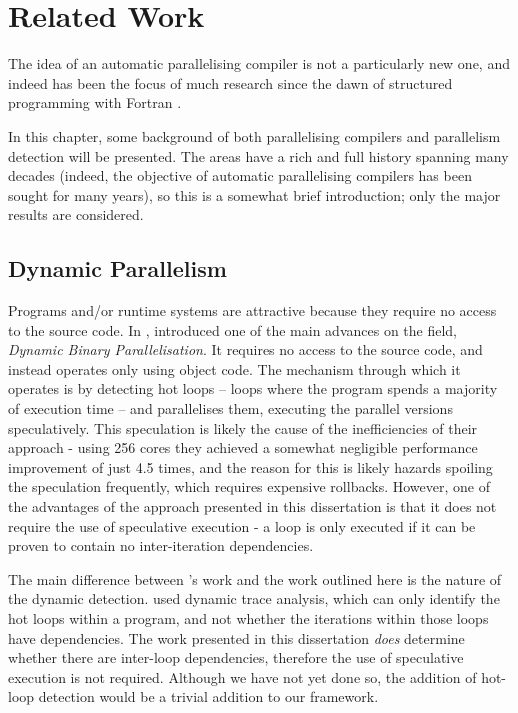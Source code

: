 \chapter{Related Work} \label{chp:related}
The idea of an automatic parallelising compiler is not a particularly new one, and indeed has been the focus of much research since the dawn of structured programming with Fortran \citep{Backus1979}.

In this chapter, some background of both parallelising compilers and parallelism detection will be presented. The areas have a rich and full history spanning many decades (indeed, the objective of automatic parallelising compilers has been sought for many years), so this is a somewhat brief introduction; only the major results are considered.

\section{Dynamic Parallelism} \label{sec:related/compilers}
Programs and/or runtime systems are attractive because they require no access to the source code. In \citeyear{Yang2011}, \citet{Yang2011} introduced one of the main advances on the field, \textit{Dynamic Binary Parallelisation}. It requires no access to the source code, and instead operates only using object code. The mechanism through which it operates is by detecting hot loops -- loops where the program spends a majority of execution time -- and parallelises them, executing the parallel versions speculatively. This speculation is likely the cause of the inefficiencies of their approach - using 256 cores they achieved a somewhat negligible performance improvement of just 4.5 times, and the reason for this is likely hazards spoiling the speculation frequently, which requires expensive rollbacks. However, one of the advantages of the approach presented in this dissertation is that it does not require the use of speculative execution - a loop is only executed if it can be proven to contain no inter-iteration dependencies.
	
The main difference between \citeauthor{Yang2011}'s work and the work outlined here is the nature of the dynamic detection. \citeauthor{Yang2011} used dynamic trace analysis, which can only identify the hot loops within a program, and not whether the iterations within those loops have dependencies. The work presented in this dissertation \emph{does} determine whether there are inter-loop dependencies, therefore the use of speculative execution is not required. Although we have not yet done so, the addition of hot-loop detection would be a trivial addition to our framework.

